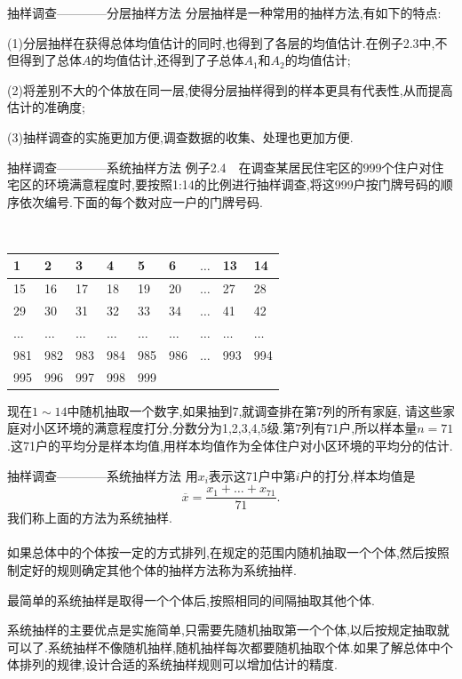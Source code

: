 \begin{frame}{抽样调查————分层抽样方法}
分层抽样是一种常用的抽样方法,有如下的特点:

(1)分层抽样在获得总体均值估计的同时,也得到了各层的均值估计.在例子2.3中,不但得到了总体$A$的均值估计,还得到了子总体$A_1$和$A_2$的均值估计;

(2)将差别不大的个体放在同一层,使得分层抽样得到的样本更具有代表性,从而提高估计的准确度;

(3)抽样调查的实施更加方便,调查数据的收集、处理也更加方便.
\end{frame}

\begin{frame}{抽样调查————系统抽样方法}
例子2.4$\quad$在调查某居民住宅区的999个住户对住宅区的环境满意程度时,要按照1:14的比例进行抽样调查,将这999户按门牌号码的顺序依次编号.下面的每个数对应一户的门牌号码.

$\quad\quad\quad$\begin{tabular}{l|l|l|l|l|l|l|l|l}
\hline 1 & 2 & 3 & 4 & 5 & 6 & $\dots$ & 13 & 14\\
\hline 15 & 16 & 17 & 18 & 19 & 20 & $\dots$ & 27 & 28\\
\hline 29 & 30 & 31 & 32 & 33 & 34 & $\dots$ & 41 & 42\\
\hline $\dots$ & $\dots$ &$\dots$ &$\dots$ &$\dots$ &$\dots$ &$\dots$ &$\dots$& $\dots$  \\
\hline 981 & 982 & 983 & 984 & 985 & 986 & $\dots$ & 993 & 994\\
\hline 995 & 996 & 997 & 998 & 999\\
\hline
\end{tabular}

现在$1\sim 14$中随机抽取一个数字,如果抽到7,就调查排在第7列的所有家庭,
请这些家庭对小区环境的满意程度打分,分数分为1,2,3,4,5级.第7列有71户,所以样本量$n =71$.这71户的平均分是样本均值,用样本均值作为全体住户对小区环境的平均分的估计.

\end{frame}

\begin{frame}{抽样调查————系统抽样方法}
用$x_i$表示这71户中第$i$户的打分,样本均值是
\begin{equation*}
\overline{x} = \frac{x_1+\dots+x_{71}}{71}.
\end{equation*}
我们称上面的方法为系统抽样.
\\ \hspace*{\fill} \\
如果总体中的个体按一定的方式排列,在规定的范围内随机抽取一个个体,然后按照制定好的规则确定其他个体的抽样方法称为\alert{系统抽样}.

最简单的系统抽样是取得一个个体后,按照相同的间隔抽取其他个体.

系统抽样的主要优点是实施简单,只需要先随机抽取第一个个体,以后按规定抽取就可以了.系统抽样不像随机抽样,随机抽样每次都要随机抽取个体.如果了解总体中个体排列的规律,设计合适的系统抽样规则可以增加估计的精度.
\end{frame}

